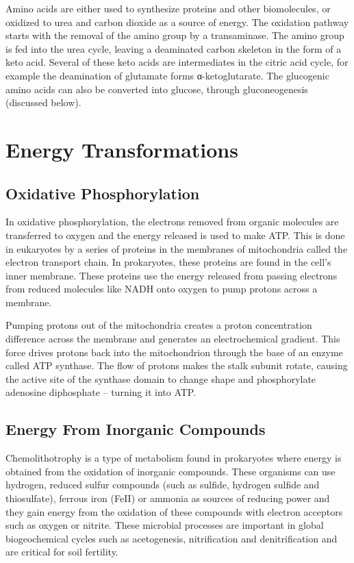 Amino acids are either used to synthesize proteins and other biomolecules, or oxidized to urea and carbon dioxide as a source of energy. The oxidation pathway starts with the removal of the amino group by a transaminase. The amino group is fed into the urea cycle, leaving a deaminated carbon skeleton in the form of a keto acid. Several of these keto acids are intermediates in the citric acid cycle, for example the deamination of glutamate forms α-ketoglutarate. The glucogenic amino acids can also be converted into glucose, through gluconeogenesis (discussed below).

\hypertarget{energy-transformations}{%
\section{Energy Transformations}\label{energy-transformations}}

\hypertarget{oxidative-phosphorylation}{%
\subsection{Oxidative Phosphorylation}\label{oxidative-phosphorylation}}

In oxidative phosphorylation, the electrons removed from organic molecules are transferred to oxygen and the energy released is used to make ATP. This is done in eukaryotes by a series of proteins in the membranes of mitochondria called the electron transport chain. In prokaryotes, these proteins are found in the cell's inner membrane. These proteins use the energy released from passing electrons from reduced molecules like NADH onto oxygen to pump protons across a membrane.

Pumping protons out of the mitochondria creates a proton concentration difference across the membrane and generates an electrochemical gradient. This force drives protons back into the mitochondrion through the base of an enzyme called ATP synthase. The flow of protons makes the stalk subunit rotate, causing the active site of the synthase domain to change shape and phosphorylate adenosine diphosphate -- turning it into ATP.

\hypertarget{energy-from-inorganic-compounds}{%
\subsection{Energy From Inorganic Compounds}\label{energy-from-inorganic-compounds}}

Chemolithotrophy is a type of metabolism found in prokaryotes where energy is obtained from the oxidation of inorganic compounds. These organisms can use hydrogen, reduced sulfur compounds (such as sulfide, hydrogen sulfide and thiosulfate), ferrous iron (FeII) or ammonia as sources of reducing power and they gain energy from the oxidation of these compounds with electron acceptors such as oxygen or nitrite. These microbial processes are important in global biogeochemical cycles such as acetogenesis, nitrification and denitrification and are critical for soil fertility.

